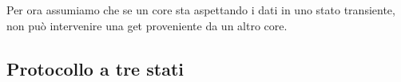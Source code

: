 \begin{warn}
    Per ora assumiamo che se un core sta aspettando i dati in uno stato transiente, non può intervenire una get proveniente da un altro core. 
\end{warn}

\begin{figure}[ht]
    \centering
    \setlength{\fboxrule}{0.5pt} %
    \setlength{\fboxsep}{0pt}    %
\end{figure}

\subsection{Protocollo a tre stati}